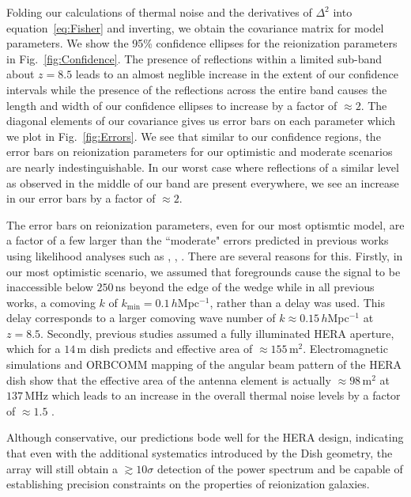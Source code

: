 \documentclass[twocolumn]{emulateapj}
\begin{document}
Folding our calculations of thermal noise and the derivatives of $\Delta^2$ into equation~\ref{eq:Fisher} and inverting, we obtain the covariance matrix for model parameters. We show the 95\% confidence ellipses for the reionization parameters in Fig.~\ref{fig:Confidence}. The presence of reflections within a limited sub-band about $z=8.5$ leads to an almost neglible increase in the extent of our confidence intervals while the presence of the reflections across the entire band causes the length and width of our confidence ellipses to increase by a factor of $\approx 2$. The diagonal elements of our covariance gives us error bars on each parameter which we plot in Fig.~\ref{fig:Errors}. We see that similar to our confidence regions, the error bars on reionization parameters for our optimistic and moderate scenarios are nearly indestinguishable. In our worst case where reflections of a similar level as observed in the middle of our band are present everywhere, we see an increase in our error bars by a factor of $\approx 2$. 

The error bars on reionization parameters, even for our most optismtic model, are a factor of a few larger than the ``moderate" errors predicted in previous works using likelihood analyses such as \citet{Pober:2014}, \citet{Greig:2015,Greig:2015b,Greig:2015c}  \citet{EwallWice:2015b}, \citet{Liu:2015a,Liu:2015b}. There are several reasons for this. Firstly, in our most optimistic scenario, we assumed that foregrounds cause the signal to be inaccessible below $250$\,ns beyond the edge of the wedge while in all previous works, a comoving $k$ of $k_\text{min}=0.1$\,$h$Mpc$^{-1}$, rather than a delay was used. This delay corresponds to a larger comoving wave number of $k\approx0.15$\,$h$Mpc$^{-1}$ at $z=8.5$. Secondly, previous studies assumed a fully illuminated HERA aperture, which for a $14$\,m dish predicts and effective area of $\approx155$\,m$^2$. Electromagnetic simulations and ORBCOMM mapping of the angular beam pattern of the HERA dish show that the effective area of the antenna element is actually $\approx 98$\,m$^2$ at $137$\,MHz which leads to an increase in the overall thermal noise levels by a factor of $\approx 1.5$ \citep{Neben:2016}. 

Although conservative, our predictions bode well for the HERA design, indicating that even with the additional systematics introduced by the Dish geometry, the array will still obtain a $\gtrsim 10 \sigma$ detection of the power spectrum and be capable of establishing precision constraints on the properties of reionization galaxies. 
\end{document}

